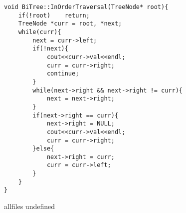\documentclass{article}
\begin{document}
\begin{CJK}{UTF8}{gbsn}
\begin{description}
    \begin{lstlisting}
void BiTree::InOrderTraversal(TreeNode* root){
    if(!root)    return;
    TreeNode *curr = root, *next;
    while(curr){
        next = curr->left;
        if(!next){
            cout<<curr->val<<endl;
            curr = curr->right;
            continue;
        }
        while(next->right && next->right != curr){
            next = next->right;
        }
        if(next->right == curr){
            next->right = NULL;
            cout<<curr->val<<endl;
            curr = curr->right;
        }else{
            next->right = curr;
            curr = curr->left;
        }
    }
}
    \end{lstlisting}
\end{description}

\fi

\ifx allfiles undefined
\end{CJK}
\end{document}
